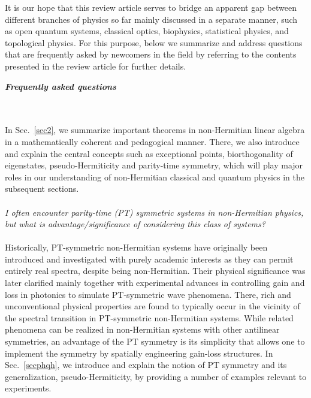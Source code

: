 \documentclass{tADP2e}
\theoremstyle{plain}
\theoremstyle{plain}
\theoremstyle{definition}
\begin{document}
It is our hope that this review article serves to bridge an apparent gap between different branches of physics so far mainly discussed in a separate manner, such as open quantum systems, classical optics, biophysics, statistical physics, and topological physics. For this purpose, below we summarize and address questions that are frequently asked by newcomers in the field by referring to the contents presented in the review article for further details. 
\vspace{7pt}
\begin{center}
\textit{ \textbf{Frequently asked questions}}
\end{center}
\vspace{10pt}
\\
\\
In Sec.~\ref{sec2}, we summarize important theorems in non-Hermitian linear algebra in a mathematically coherent and pedagogical manner. 
There, we also introduce and explain the central concepts such as exceptional points, biorthogonality of eigenstates, pseudo-Hermiticity and parity-time symmetry, which will play major roles in our understanding of non-Hermitian classical and quantum physics in the subsequent sections. 
\\
\\
{\it I often encounter parity-time (PT) symmetric systems in non-Hermitian physics, but what is advantage/significance of considering this class of systems?}
\\
\\ 
Historically, PT-symmetric non-Hermitian systems have originally been introduced and investigated with purely academic interests as they can permit entirely real spectra, despite being non-Hermitian. Their physical significance was later clarified mainly together with experimental advances in controlling gain and loss in photonics to simulate PT-symmetric wave phenomena. There, rich and unconventional physical properties are found to typically occur in the vicinity of the spectral transition in PT-symmetric non-Hermitian systems. While  related phenomena can be realized in non-Hermitian systems with other antilinear symmetries, an advantage of the PT symmetry is its simplicity that allows one to implement the symmetry by spatially engineering gain-loss structures. In Sec.~\ref{secphqh}, we introduce and explain the notion of PT symmetry and its generalization,  pseudo-Hermiticity, by providing a number of examples relevant to experiments. 
\end{document}
